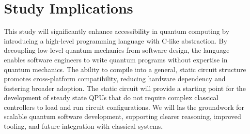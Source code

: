 \documentclass[journal,onecolumn, compsoc]{IEEEtran}
\begin{document}
\section{Study Implications}
This study will significantly enhance accessibility in quantum computing by introducing a high-level programming language with C-like abstraction. 
By decoupling low-level quantum mechanics from software design, the language enables software engineers to write quantum programs without expertise in quantum mechanics. 
The ability to compile into a general, static circuit structure promotes cross-platform compatibility, reducing hardware dependency and fostering broader adoption. 
The static circuit will provide a starting point for the development of steady state QPUs that do not require complex classical controllers to load and run circuit configurations.
We will las the groundwork for scalable quantum software development, supporting clearer reasoning, improved tooling, and future integration with classical systems. 



\end{document}
